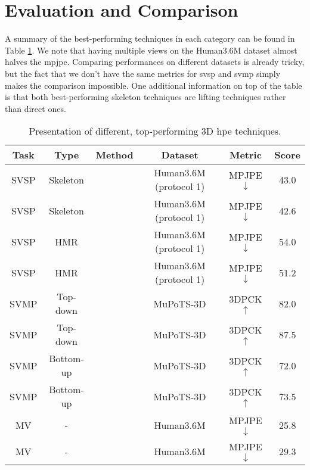 \documentclass[runningheads]{llncs}
\begin{document}
\section{Evaluation and Comparison}
A summary of the best-performing techniques in each category can be found in Table \ref{table: presentation of results}. We note that having multiple views on the Human3.6M dataset almost halves the \ac{mpjpe}. Comparing performances on different datasets is already tricky, but the fact that we don't have the same metrics for \ac{svsp} and \ac{svmp} simply makes the comparison impossible. One additional information on top of the table is that both best-performing skeleton techniques are lifting techniques rather than direct ones.
\begin{table}
  \centering
  \caption{Presentation of different, top-performing 3D \ac{hpe} techniques.}
  \label{table: presentation of results}
  \begin{tabular}{|cccccc|}
    \hline
    Task & Type      & Method                                          & Dataset                & Metric             & Score \\ \hline
    SVSP     & Skeleton  & \cite{multi hypothesis transformer}             & Human3.6M (protocol 1) & MPJPE $\downarrow$ & 43.0  \\
    SVSP     & Skeleton  & \cite{hrnet}                                    & Human3.6M (protocol 1) & MPJPE $\downarrow$ & 42.6  \\
    SVSP     & HMR       & \cite{mesh reconstruction with transformers}    & Human3.6M (protocol 1) & MPJPE $\downarrow$ & 54.0  \\
    SVSP     & HMR       & \cite{mesh graphormer}                          & Human3.6M (protocol 1) & MPJPE $\downarrow$ & 51.2  \\ \hline
    SVMP     & Top-down  & \cite{HMOR}                                     & MuPoTS-3D              & 3DPCK $\uparrow$   & 82.0  \\
    SVMP     & Top-down  & \cite{graph and temporal convolutional network} & MuPoTS-3D              & 3DPCK $\uparrow$   & 87.5  \\
    SVMP     & Bottom-up & \cite{PandaNet}                                 & MuPoTS-3D              & 3DPCK $\uparrow$   & 72.0  \\
    SVMP     & Bottom-up & \cite{SMAP}                                     & MuPoTS-3D              & 3DPCK $\uparrow$   & 73.5  \\ \hline
    MV       & -         & \cite{Transfusion}                              & Human3.6M              & MPJPE $\downarrow$ & 25.8  \\
    MV       & -         & \cite{MetaFuse}                                 & Human3.6M              & MPJPE $\downarrow$ & 29.3  \\
    \hline
  \end{tabular}
\end{table}
\end{document}

